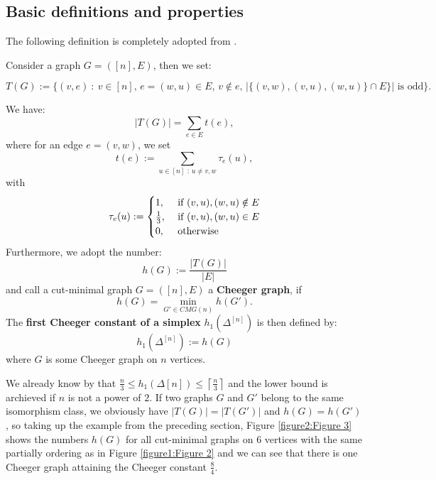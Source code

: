 \subsection{Basic definitions and properties}
The following definition is completely adopted from \cite{1}.
\begin{defi}\label{definition1}
Consider a graph \(G=([n],E)\), then we set:
\begin{small}
\[
T(G):=\{(v,e)\: :\: v\in [n]\text{, }e=(w,u)\in E\text{, }v\notin e\text{, }|\{(v,w),(v,u),(w,u)\}\cap E\}|\text{ is odd}\}.
\]
\end{small}
We have:
\[
|T(G)|=\sum\limits_{e\in E}t(e),
\]
where for an edge \(e=(v,w)\), we set
\[
t(e):=\sum\limits_{u\in[n]\text{ : }u\neq v,w}\tau_e(u),
\]
with
\begin{equation}
\tau_e(u):=
\begin{cases}
1,&\text{ if }(v,u),(w,u)\notin E\notag\\
\frac{1}{3},&\text{ if }(v,u),(w,u)\in E\notag\\
0,&\text{ otherwise}\notag
\end{cases}
\end{equation}
Furthermore, we adopt the number:
\[
h(G):=\frac{|T(G)|}{|E|}
\]
and call a cut-minimal graph \(G=([n],E)\) a \textbf{Cheeger graph}, if
\[
h(G)=\min\limits_{G'\in CMG(n)}h(G').
\]
The \textbf{first Cheeger constant of a simplex} \(h_1(\Delta^{[n]})\) is then defined by:
\[
h_1(\Delta^{[n]}):=h(G)
\]
where \(G\) is some Cheeger graph on \(n\) vertices.
\end{defi}
We already know by \cite{1} that \(\frac{n}{3}\leq h_1(\Delta{[n]})\leq\left\lceil\frac{n}{3}\right\rceil\) and the lower bound is archieved if \(n\) is not a power of \(2\). If two graphs \(G\) and \(G'\) belong to the same isomorphism class, we obviously have \(|T(G)|=|T(G')|\) and \(h(G)=h(G')\), so taking up the example from the preceding section, Figure \ref{figure2:Figure 3} shows the numbers \(h(G)\) for all cut-minimal graphs on \(6\) vertices with the same partially ordering as in Figure \ref{figure1:Figure 2} and we can see that there is one Cheeger graph attaining the Cheeger constant \(\frac{8}{4}\).



